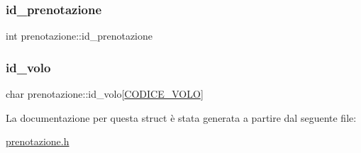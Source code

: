 \mbox{\label{structprenotazione_aff7a4c44ea722bb4392ea60a4ab7733a}} 
\subsubsection{\texorpdfstring{id\+\_\+prenotazione}{id\_prenotazione}}
{\footnotesize\ttfamily int prenotazione\+::id\+\_\+prenotazione}

\mbox{\label{structprenotazione_a8cf5b189dadd542d8d961f5070797194}} 
\subsubsection{\texorpdfstring{id\+\_\+volo}{id\_volo}}
{\footnotesize\ttfamily char prenotazione\+::id\+\_\+volo\mbox{[}\hyperlink{costanti_8h_a99ae2e7fbc7078b725a05249bd95f22c}{C\+O\+D\+I\+C\+E\+\_\+\+V\+O\+LO}\mbox{]}}



La documentazione per questa struct è stata generata a partire dal seguente file\+:\begin{DoxyCompactItemize}
\item 
\hyperlink{prenotazione_8h}{prenotazione.\+h}\end{DoxyCompactItemize}
